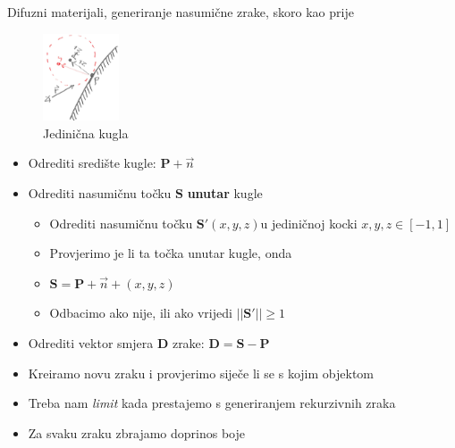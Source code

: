 \documentclass[9pt]{beamer}
\begin{document}
\begin{frame}{Difuzni materijali, generiranje nasumične zrake, skoro kao prije}
\begin{figure}
	\includegraphics[width=0.2\textwidth]{./slike/rand-vector.png}
	\caption{Jedinična kugla}
\end{figure}
\begin{itemize}
	\item Odrediti središte kugle: $\mathbf{P} + \vec{n}$
	\item Odrediti nasumičnu točku $\mathbf{S}$ \textbf{unutar} kugle
	\begin{itemize}
		\item Odrediti nasumičnu točku $\mathbf{S}'(x,y,z)$u jediničnoj kocki $x, y, z \in \left[-1, 1\right]$
		\item Provjerimo je li ta točka unutar kugle, onda \item $\mathbf{S} = \mathbf{P} + \vec{n} + (x, y, z)$
		\item Odbacimo ako nije, ili ako vrijedi $||\mathbf{S}'|| \geq 1$
	\end{itemize}
	\item Odrediti vektor smjera $\mathbf{D}$ zrake: $\mathbf{D} = \mathbf{S}-\mathbf{P}$
	\item Kreiramo novu zraku i provjerimo siječe li se s kojim objektom
	\item Treba nam \textit{limit} kada prestajemo s generiranjem rekurzivnih zraka
	\item Za svaku zraku zbrajamo doprinos boje
\end{itemize}
\end{frame}
\end{document}
